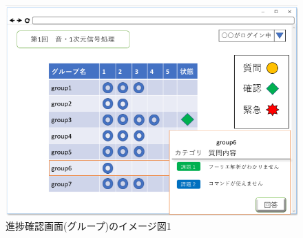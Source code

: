 \begin{figure}[htbp]
\begin{minipage}{0.5\hsize}
 \end{minipage}
 \begin{minipage}{0.5\hsize}
  \begin{center}
   \includegraphics[width=1\linewidth,clip]{./img/21.png}
  \end{center}
 \end{minipage}
 \caption{進捗確認画面(グループ)のイメージ図1}\label{fig:20}
\end{figure}



